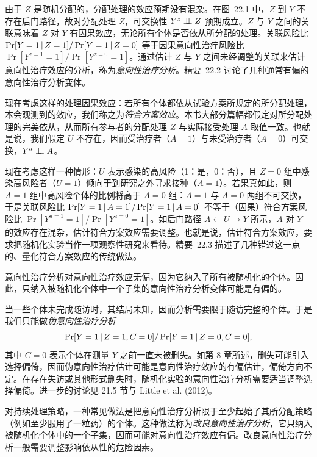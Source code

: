 由于 $Z$ 是随机分配的，分配处理的效应预期没有混杂。在图~22.1 中，$Z$ 到 $Y$ 不存在后门路径，故对分配处理 $Z$，可交换性 $Y^{z}\perp\!\!\!\perp Z$ 预期成立。$Z$ 与 $Y$ 之间的关联意味着 $Z$ 对 $Y$ 有因果效应，无论所有个体是否依从所分配的处理。关联风险比 $\Pr[Y=1\,|\, Z=1]/\Pr[Y=1\,|\, Z=0]$ 等于因果意向性治疗风险比 $\Pr[Y^{z=1}=1]/\Pr[Y^{z=0}=1]$。通过估计 $Z$ 与 $Y$ 之间未经调整的关联来估计意向性治疗效应的分析，称为\emph{意向性治疗分析}。精要~22.2 讨论了几种通常有偏的意向性治疗分析变体。

现在考虑这样的处理因果效应：若所有个体都依从试验方案所规定的所分配处理，本会观测到的效应，我们称之为\emph{符合方案效应}。本书大部分篇幅都假定对所分配处理的完美依从，从而所有参与者的分配处理 $Z$ 与实际接受处理 $A$ 取值一致。也就是说，我们假定 $U$ 不存在，因而受治疗者（$A=1$）与未受治疗者（$A=0$）可交换，$Y^{a}\perp\!\!\!\perp A$。

现在考虑这样一种情形：$U$ 表示感染的高风险（1：是，0：否），且 $Z=0$ 组中感染高风险者（$U=1$）倾向于到研究之外寻求接种（$A=1$）。若果真如此，则 $A=1$ 组中高风险个体的比例将高于 $A=0$ 组：$A=1$ 与 $A=0$ 两组不可交换，于是关联风险比 $\Pr[Y=1\,|\, A=1]/\Pr[Y=1\,|\, A=0]$ 不等于（因果）符合方案风险比 $\Pr[Y^{a=1}=1]/\Pr[Y^{a=0}=1]$。如后门路径 $A\leftarrow U\to Y$ 所示，$A$ 对 $Y$ 的效应存在混杂，估计符合方案效应需要调整。也就是说，估计符合方案效应，要求把随机化实验当作一项观察性研究来看待。精要~22.3 描述了几种错过这一点的、量化符合方案效应的传统做法。

\begin{finepoint}[伪意向性治疗分析与改良意向性治疗分析]
意向性治疗分析对意向性治疗效应无偏，因为它纳入了所有被随机化的个体。因此，只纳入被随机化个体中一个子集的意向性治疗分析变体可能是有偏的。

当一些个体未完成随访时，其结局未知，因而分析需要限于随访完整的个体。于是我们只能做\emph{伪意向性治疗分析}
\[
\Pr[Y=1\,|\, Z=1,C=0]/\Pr[Y=1\,|\, Z=0,C=0],
\]
其中 $C=0$ 表示个体在测量 $Y$ 之前一直未被删失。如第 8 章所述，删失可能引入选择偏倚，因而伪意向性治疗估计可能是意向性治疗效应的有偏估计，偏倚方向不定。在存在失访或其他形式删失时，随机化实验的意向性治疗分析需要适当调整选择偏倚。进一步的讨论见 21.5 节与 Little et al. (2012)。

对持续处理策略，一种常见做法是把意向性治疗分析限于至少起始了其所分配策略（例如至少服用了一粒药）的个体。这种做法称为\emph{改良意向性治疗分析}，它只纳入被随机化个体中的一个子集，因而可能对意向性治疗效应有偏。改良意向性治疗分析一般需要调整影响依从性的危险因素。
\end{finepoint}


